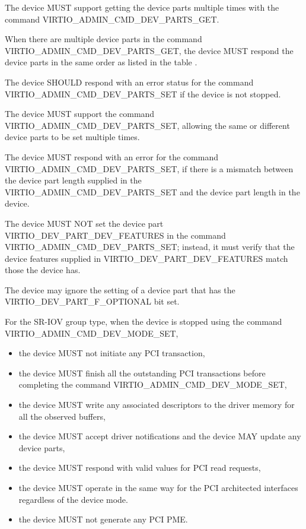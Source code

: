 The device MUST support getting the device parts multiple times
with the command VIRTIO_ADMIN_CMD_DEV_PARTS_GET.

When there are multiple device parts in the command
VIRTIO_ADMIN_CMD_DEV_PARTS_GET, the device MUST respond the device parts in the
same order as listed in the table
.

The device SHOULD respond with an error status for the command
VIRTIO_ADMIN_CMD_DEV_PARTS_SET if the device is not stopped.

The device MUST support the command VIRTIO_ADMIN_CMD_DEV_PARTS_SET,
allowing the same or different device parts to be set multiple times.

The device MUST respond with an error for the command
VIRTIO_ADMIN_CMD_DEV_PARTS_SET, if there is a mismatch between the
device part length supplied in the VIRTIO_ADMIN_CMD_DEV_PARTS_SET
and the device part length in the device.

The device MUST NOT set the device part VIRTIO_DEV_PART_DEV_FEATURES in
the command VIRTIO_ADMIN_CMD_DEV_PARTS_SET; instead,
it must verify that the device features supplied in
VIRTIO_DEV_PART_DEV_FEATURES match those the device has.

The device may ignore the setting of a device part that has the
VIRTIO_DEV_PART_F_OPTIONAL bit set.

For the SR-IOV group type, when the device is stopped using the command
VIRTIO_ADMIN_CMD_DEV_MODE_SET,
\begin{itemize}
\item the device MUST not initiate any PCI transaction,
\item the device MUST finish all the outstanding PCI transactions before completing
      the command VIRTIO_ADMIN_CMD_DEV_MODE_SET,
\item the device MUST write any associated descriptors to the driver memory for
      all the observed buffers,
\item the device MUST accept driver notifications and the device MAY update any
      device parts,
\item the device MUST respond with valid values for PCI read requests,
\item the device MUST operate in the same way for the PCI architected interfaces
      regardless of the device mode.
\item the device MUST not generate any PCI PME.
\end{itemize}

